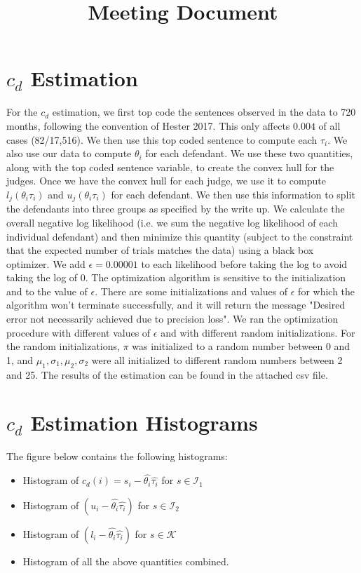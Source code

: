 \documentclass[11pt]{article}
\title{Meeting Document}
\begin{document}
\maketitle

\section{$c_d$ Estimation}
  For the $c_d$ estimation, we first top code the sentences observed in the data to 720 months, following the convention of Hester 2017. This only affects $0.004$ of all cases (82/17,516). We then use this top coded sentence to compute each $\tau_i$. We also use our data to compute $\theta_i$ for each defendant. We use these two quantities, along with the top coded sentence variable, to create the convex hull for the judges. Once we have the convex hull for each judge, we use it to compute $l_j(\theta_i \tau_i)$ and $u_j(\theta_i \tau_i)$ for each defendant. We then use this information to split the defendants into three groups as specified by the write up. We calculate the overall negative log likelihood (i.e. we sum the negative log likelihood of each individual defendant) and then minimize this quantity (subject to the constraint that the expected number of trials matches the data) using a black box optimizer. We add $\epsilon=0.00001$ to each likelihood before taking the log to avoid taking the log of 0. The optimization algorithm is sensitive to the initialization and to the value of $\epsilon$. There are some initializations and values of $\epsilon$ for which the algorithm won't terminate successfully, and it will return the message "Desired error not necessarily achieved due to precision loss". We ran the optimization procedure with different values of $\epsilon$ and with different random initializations. For the random initializations, $\pi$ was initialized to a random number between 0 and 1, and $\mu_1, \sigma_1, \mu_2, \sigma_2$ were all initialized to different random numbers between 2 and 25. The results of the estimation can be found in the attached csv file. 

\section{$c_d$ Estimation Histograms}
  The figure below contains the following histograms: 
  \begin{itemize}
      \item Histogram of $c_d(i) = s_i - \hat{\theta_i}\hat{\tau_i}$ for $s\in \mathcal{I}_1$
      \item Histogram of $(u_i - \hat{\theta_i}\hat{\tau_i})$ for $s\in \mathcal{I}_2$
      \item Histogram of $(l_i - \hat{\theta_i}\hat{\tau_i})$ for $s\in \mathcal{K}$
      \item Histogram of all the above quantities combined. 
  \end{itemize}
\end{document}
